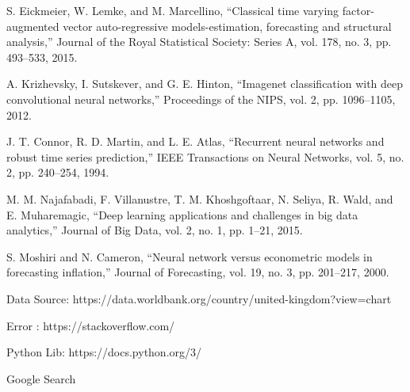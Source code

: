 \begin{thebibliography}{99}
 S. Eickmeier, W. Lemke, and M. Marcellino, “Classical time varying factor-augmented vector auto-regressive models-estimation, forecasting and structural analysis,” Journal of the Royal Statistical Society: Series A, vol. 178, no. 3, pp. 493–533, 2015.




 A. Krizhevsky, I. Sutskever, and G. E. Hinton, “Imagenet classification with deep convolutional neural networks,” Proceedings of the NIPS, vol. 2, pp. 1096–1105, 2012.



 J. T. Connor, R. D. Martin, and L. E. Atlas, “Recurrent neural networks and robust time series prediction,” IEEE Transactions on Neural Networks, vol. 5, no. 2, pp. 240–254, 1994.




 M. M. Najafabadi, F. Villanustre, T. M. Khoshgoftaar, N. Seliya, R. Wald, and E. Muharemagic, “Deep learning applications and challenges in big data analytics,” Journal of Big Data, vol. 2, no. 1, pp. 1–21, 2015.



 S. Moshiri and N. Cameron, “Neural network versus econometric models in forecasting inflation,” Journal of Forecasting, vol. 19, no. 3, pp. 201–217, 2000.

 Data Source: https://data.worldbank.org/country/united-kingdom?view=chart

 Error : https://stackoverflow.com/

 Python Lib: https://docs.python.org/3/

 Google Search

\end{thebibliography}
